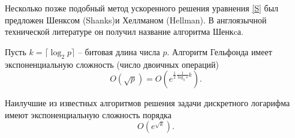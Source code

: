 Несколько позже подобный метод ускоренного решения уравнения \ref{S} был предложен Шенксом (Shanks)и Хеллманом (Hellman). В англоязычной технической литературе он получил название алгоритма Шенкcа.

Пусть $k = \lceil \log_2 p \rceil$ -- битовая длина числа $p$. Алгоритм Гельфонда имеет  экспоненциальную сложность (число двоичных операций)
    \[ O(\sqrt{p}) = O(e^{\frac{1}{2} \frac{1}{\log_2 e} k}). \]

Наилучшие из известных алгоритмов решения задачи дискретного логарифма имеют экспоненциальную сложность порядка
    \[ O(e^{\sqrt{k}}). \]

